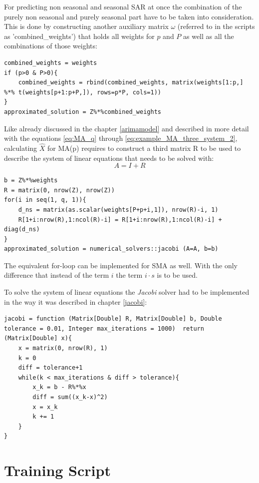 For predicting non seasonal and seasonal \acs{SAR} at once the combination of the purely non seasonal and purely seasonal part have to be taken into consideration. This is done by constructing another auxiliary matrix $\omega$ (referred to in the scripts as 'combined\_weights') that holds all weights for $p$ and $P$ as well as all the combinations of those weights:

\begin{lstlisting}[caption=Prediction of \acs{SAR}$(p)(P)$ ,captionpos=b]
combined_weights = weights
if (p>0 & P>0){
	combined_weights = rbind(combined_weights, matrix(weights[1:p,] %*% t(weights[p+1:p+P,]), rows=p*P, cols=1))
}
approximated_solution = Z%*%combined_weights
\end{lstlisting}

Like already discussed in the chapter \ref{arimamodel} and described in more detail with the equations \eqref{eq:MA_q} through \eqref{eq:example_MA_three_system_2}, calculating $\hat{X}$ for \acs{MA}(p) requires to construct a third matrix R to be used to describe the system of linear equations that needs to be solved with:
\[A = I + R\]

\begin{lstlisting}[caption=Prediction of \acs{MA}$(q)$ ,captionpos=b]
b = Z%*%weights
R = matrix(0, nrow(Z), nrow(Z))
for(i in seq(1, q, 1)){
	d_ns = matrix(as.scalar(weights[P+p+i,1]), nrow(R)-i, 1)
	R[1+i:nrow(R),1:ncol(R)-i] = R[1+i:nrow(R),1:ncol(R)-i] + diag(d_ns)
}
approximated_solution = numerical_solvers::jacobi (A=A, b=b)
\end{lstlisting}

The equivalent for-loop can be implemented for \acs{SMA} as well. With the only difference that instead of the term $i$ the term $i\cdot s$ is to be used.

To solve the system of linear equations the \textit{Jacobi} solver had to be implemented in the way it was described in chapter \ref{jacobi}:
\begin{lstlisting}[caption=Prediction of \acs{MA}$(q)$ ,captionpos=b]
jacobi = function (Matrix[Double] R, Matrix[Double] b, Double tolerance = 0.01, Integer max_iterations = 1000)  return (Matrix[Double] x){
	x = matrix(0, nrow(R), 1)
  	k = 0
	diff = tolerance+1
	while(k < max_iterations & diff > tolerance){
		x_k = b - R%*%x
		diff = sum((x_k-x)^2)
		x = x_k
		k += 1
	}
}
\end{lstlisting}

\section{Training Script}


